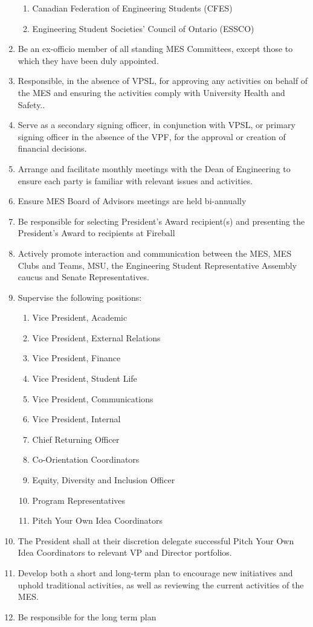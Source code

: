 \begin{enumerate}
  \begin{enumerate}
   \item
    Canadian Federation of Engineering Students (CFES)
   \item
    Engineering Student Societies' Council of Ontario (ESSCO)
  \end{enumerate}
 \item
  Be an ex-officio member of all standing MES Committees, except those to which they have been duly appointed.
 \item
  Responsible, in the absence of VPSL, for approving any activities on behalf of the MES and ensuring the activities comply with University Health and Safety..
 \item
  Serve as a secondary signing officer, in conjunction with VPSL, or primary signing officer in the absence of the VPF, for the approval or creation of financial decisions.
 \item
  Arrange and facilitate monthly meetings with the Dean of Engineering to ensure each party is familiar with relevant issues and activities.
 \item
  Ensure MES Board of Advisors meetings are held bi-annually
 \item
  Be responsible for selecting President's Award recipient(s) and presenting the President's Award to recipients at Fireball
 \item
  Actively promote interaction and communication between the MES, MES Clubs and Teams, MSU, the Engineering Student Representative Assembly caucus and Senate Representatives.
 \item
  Supervise the following positions:

  \begin{enumerate}
   \item
    Vice President, Academic
   \item
    Vice President, External Relations
   \item
    Vice President, Finance
   \item
    Vice President, Student Life
   \item
    Vice President, Communications
   \item
    Vice President, Internal
   \item
    Chief Returning Officer
   \item
    Co-Orientation Coordinators
   \item
    Equity, Diversity and Inclusion Officer
   \item
    Program Representatives
    \item
    Pitch Your Own Idea Coordinators
  \end{enumerate}
 \item 
  The President shall at their discretion delegate successful Pitch Your Own Idea Coordinators to relevant VP and Director portfolios.
 \item
  Develop both a short and long-term plan to encourage new initiatives and uphold traditional activities, as well as reviewing the current activities of the MES.
 \item
  Be responsible for the long term plan


\end{enumerate}
